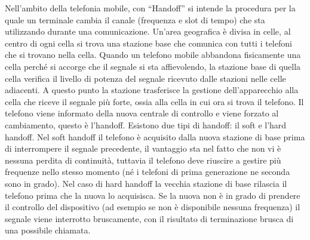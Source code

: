 Nell’ambito della telefonia mobile, con “Handoff” si intende la procedura per la quale un terminale cambia il canale (frequenza e slot di tempo) che sta utilizzando durante una comunicazione.
Un’area geografica è divisa in celle, al centro di ogni cella si trova una stazione base che comunica con tutti i telefoni che si trovano nella cella.
Quando un telefono mobile abbandona fisicamente una cella perché si accorge che il segnale si sta affievolendo, la stazione base di quella cella verifica il livello di potenza del segnale ricevuto dalle stazioni nelle celle adiacenti. A questo punto la stazione trasferisce la gestione dell’apparecchio alla cella che riceve il segnale più forte, ossia alla cella in cui ora si trova il telefono.
Il telefono viene informato della nuova centrale di controllo e viene forzato al cambiamento, questo è l’handoff.
Esistono due tipi di handoff: il soft e l’hard handoff. Nel soft handoff il telefono è acquisito dalla nuova stazione di base prima di interrompere il segnale precedente, il vantaggio sta nel fatto che non vi è nessuna perdita di continuità, tuttavia il telefono deve riuscire a gestire più frequenze nello stesso momento (né i telefoni di prima generazione ne seconda sono in grado).
Nel caso di hard handoff la vecchia stazione di base rilascia il telefono prima che la nuova lo acquisisca. Se la nuova non è in grado di prendere il controllo del dispositivo (ad esempio se non è disponibile nessuna frequenza) il segnale viene interrotto bruscamente, con il risultato di terminazione brusca di una possibile chiamata.


